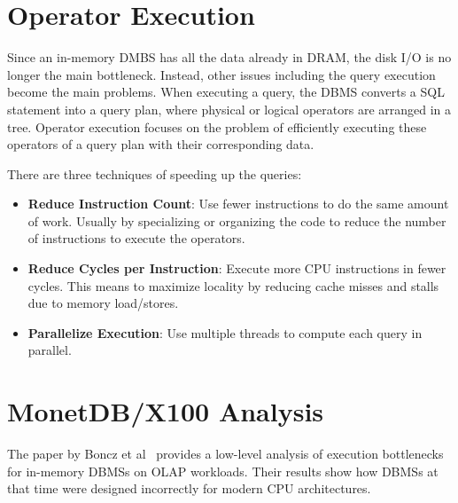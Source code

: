 \documentclass[11pt]{article}
\begin{document}
\maketitle
\thispagestyle{plain}

\section{Operator Execution}
Since an in-memory DMBS has all the data already in DRAM, the disk I/O is no longer the main 
bottleneck. Instead, other issues including the query execution become the main problems. When
executing a query, the DBMS converts a SQL statement into a query plan, where physical or logical 
operators are arranged in a tree. Operator execution focuses on the problem of efficiently 
executing these operators of a query plan with their corresponding data. 


There are three techniques of speeding up the queries:
\begin{itemize}
    \item \textbf{Reduce Instruction Count}: 
    Use fewer instructions to do the same amount of work. 
    Usually by specializing or organizing the code to reduce the number of instructions to execute 
    the operators. 
    \item \textbf{Reduce Cycles per Instruction}: 
    Execute more CPU instructions in fewer cycles. 
    This means to maximize locality by reducing cache misses and stalls due to memory load/stores.
    \item \textbf{Parallelize Execution}: 
    Use multiple threads to compute each query in parallel.
\end{itemize}

\section{MonetDB/X100 Analysis}
The paper by Boncz et al~\cite{Boncz2005} provides a low-level analysis of execution  
bottlenecks for in-memory DBMSs on OLAP workloads. Their results show how DBMSs at that time were 
designed incorrectly for modern CPU architectures.

\end{document}
